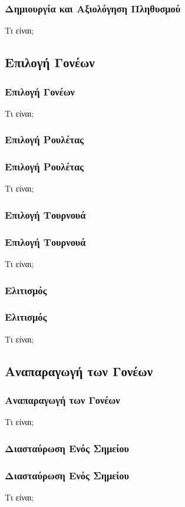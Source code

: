 \documentclass[xetex,mathserif,serif,14pt]{beamer}
\begin{document}
\begin{frame}
\frametitle{Δημιουργία και Αξιολόγηση Πληθυσμού}
Τι είναι;
\end{frame}

\subsection{Επιλογή Γονέων}

\begin{frame}
\frametitle{Επιλογή Γονέων}
Τι είναι;
\end{frame}

\subsubsection*{Επιλογή Ρουλέτας}

\begin{frame}
\frametitle{Επιλογή Ρουλέτας}
Τι είναι;
\end{frame}

\subsubsection*{Επιλογή Τουρνουά}

\begin{frame}
\frametitle{Επιλογή Τουρνουά}
Τι είναι;
\end{frame}

\subsubsection*{Ελιτισμός}

\begin{frame}
\frametitle{Ελιτισμός}
Τι είναι;
\end{frame}

\subsection{Αναπαραγωγή των Γονέων}

\begin{frame}
\frametitle{Αναπαραγωγή των Γονέων}
Τι είναι;
\end{frame}

\subsubsection{Διασταύρωση Ενός Σημείου}

\begin{frame}
\frametitle{Διασταύρωση Ενός Σημείου}
Τι είναι;
\end{frame}
\end{document}
